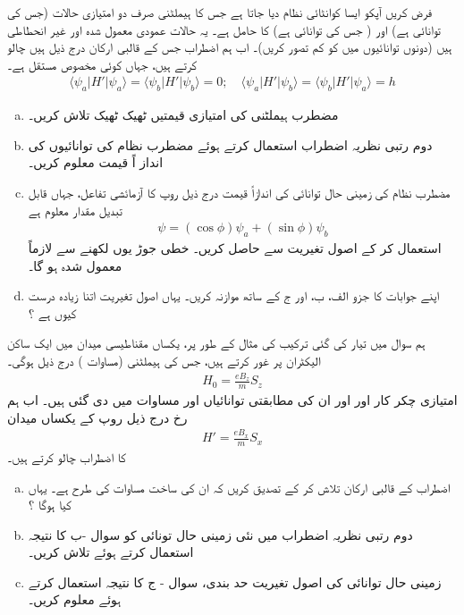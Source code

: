 فرض کریں آپکو ایسا کوانٹائی نظام دیا جاتا ہے جس کا ہیملٹنی  صرف دو امتیازی حالات  (جس کی توانائی  ہے) اور  ( جس کی توانائی  ہے) کا حامل ہے۔ یہ حالات عمودی معمول شدہ اور غیر انحطاطی ہیں (دونوں توانائیوں میں  کو کم تصور کریں)۔ اب ہم اضطراب  جس کے قالبی ارکان درج ذیل ہیں چالو کرتے ہیں، جہاں  کوئی مخصوص مستقل ہے۔
\begin{align}\label{مساوات_تغیریت_قالبی_ارکان_دیے_گئے}
\langle \psi_{a}|H'|\psi_{a}\rangle=\langle \psi_{b}|H'|\psi_{b}\rangle=0; \quad \langle \psi_{a}|H'|\psi_{b}\rangle=\langle \psi_{b}|H'|\psi_{a}\rangle=h
\end{align}
\begin{enumerate}[a.]
\item
 مضطرب ہیملٹنی کی امتیازی قیمتیں   ٹھیک ٹھیک   تلاش کریں۔
\item
دوم رتبی نظریہ اضطراب استعمال کرتے ہوئے مضطرب نظام کی توانائیوں کی انداز اً قیمت معلوم کریں۔
\item
 مضطرب نظام کی زمینی حال توانائی کی اندازاً قیمت درج ذیل روپ کا آزمائشی تفاعل، جہاں  قابل تبدیل مقدار معلوم ہے 
\begin{align}
\psi=(\cos{\phi})\psi_{a}+(\sin{\phi})\psi_{b} 
\end{align}
 استعمال کر کے اصول تغیریت سے حاصل کریں۔  خطی جوڑ یوں لکھنے سے  لازماً معمول شدہ ہو گا۔
\item
 اپنے جوابات کا جزو الف، ب، اور ج کے ساتھ موازنہ کریں۔ یہاں اصول تغیریت اتنا زیادہ درست کیوں ہے ؟
 \end{enumerate}
ہم سوال  میں تیار کی گئی ترکیب کی مثال کے طور پر، یکساں مقناطیسی میدان  میں ایک ساکن الیکٹران پر غور کرتے ہیں، جس کی ہیملٹنی (مساوات ) درج ذیل ہوگی۔
\begin{align}
H_{0}=\frac{eB_{z}}{m}S_{z} 
\end{align}
 امتیازی چکر کار  اور  اور ان کی مطابقتی توانائیاں  اور  مساوات  میں دی گئی ہیں۔ اب ہم  رخ درج ذیل روپ کے یکساں میدان
\begin{align}
H'=\frac{eB_{x}}{m}S_{x} 
\end{align}
 کا اضطراب چالو کرتے ہیں۔
 \begin{enumerate}[a.]
\item
 اضطراب  کے قالبی ارکان تلاش کر کے تصدیق کریں کہ ان کی ساخت مساوات  کی طرح ہے۔ یہاں  کیا ہوگا ؟
\item
 دوم رتبی نظریہ اضطراب میں نئی زمینی حال تونائی کو سوال -ب کا نتیجہ استعمال کرتے ہوئے تلاش کریں۔
\item
 زمینی حال توانائی کی اصول تغیریت حد بندی، سوال - ج کا نتیجہ استعمال کرتے ہوئے معلوم کریں۔
 \end{enumerate}
